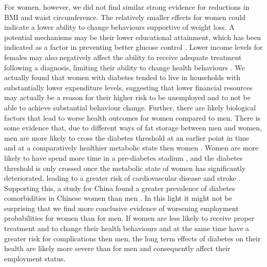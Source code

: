 For women, however, we did not find similar strong evidence for reductions in \ac{BMI} and waist circumference. The relatively smaller effects for women could indicate a lower ability to change behaviours supportive of weight loss. A potential mechanisms may be their lower educational attainment, which has been indicated as a factor in preventing better glucose control \autocite{Luo2015}. Lower income levels for females may also negatively affect the ability to receive adequate treatment following a diagnosis, limiting their ability to change health behaviours \autocite{Luo2015}. We actually found that women with diabetes tended to live in households with substantially lower expenditure levels, suggesting that lower financial resources may actually be a reason for their higher risk to be unemployed and to not be able to achieve substantial behaviour change. Further, there are likely biological factors that lead to worse health outcomes for women compared to men. There is some evidence that, due to different ways of fat storage between men and women, men are more likely to cross the diabetes threshold at an earlier point in time and at a comparatively healthier metabolic state then women \parencite{Peters2015,Peters2014a,Peters2014}. Women are more likely to have spend more time in a pre-diabetes stadium \parencite{Bertram2010}, and the diabetes threshold is only crossed once the metabolic state of women has significantly deteriorated, leading to a greater risk of cardiovascular disease and stroke \parencite{Peters2015}. Supporting this, a study for China found a greater prevalence of diabetes comorbidities in Chinese women than men \autocite{Liu2010}. In this light it might not be surprising that we find more conclusive evidence of worsening employment probabilities for women than for men. If women are less likely to receive proper treatment and to change their health behaviours and at the same time have a greater risk for complications then men, the long term effects of diabetes on their health are likely more severe than for men and consequently affect their employment status.

